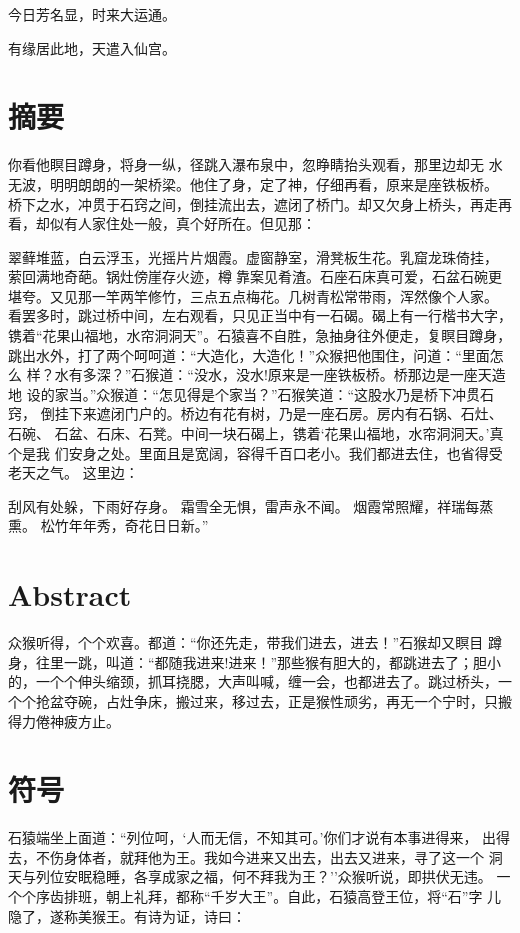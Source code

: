 \documentclass[]{style/zjuthesis}
\begin{document}
今日芳名显，时来大运通。

有缘居此地，天遣入仙宫。

\chapter{摘要}

你看他瞑目蹲身，将身一纵，径跳入瀑布泉中，忽睁睛抬头观看，那里边却无
水无波，明明朗朗的一架桥梁。他住了身，定了神，仔细再看，原来是座铁板桥。
桥下之水，冲贯于石窍之间，倒挂流出去，遮闭了桥门。却又欠身上桥头，再走再
看，却似有人家住处一般，真个好所在。但见那：

翠藓堆蓝，白云浮玉，光摇片片烟霞。虚窗静室，滑凳板生花。乳窟龙珠倚挂，
萦回满地奇葩。锅灶傍崖存火迹，樽靠案见肴渣。石座石床真可爱，石盆石碗更
堪夸。又见那一竿两竿修竹，三点五点梅花。几树青松常带雨，浑然像个人家。
看罢多时，跳过桥中间，左右观看，只见正当中有一石碣。碣上有一行楷书大字，
镌着``花果山福地，水帘洞洞天''。石猿喜不自胜，急抽身往外便走，复瞑目蹲身，
跳出水外，打了两个呵呵道：``大造化，大造化！''众猴把他围住，问道：``里面怎么
样？水有多深？''石猴道：``没水，没水!原来是一座铁板桥。桥那边是一座天造地
设的家当。''众猴道：``怎见得是个家当？''石猴笑道：``这股水乃是桥下冲贯石窍，
倒挂下来遮闭门户的。桥边有花有树，乃是一座石房。房内有石锅、石灶、石碗、
石盆、石床、石凳。中间一块石碣上，镌着`花果山福地，水帘洞洞天。'真个是我
们安身之处。里面且是宽阔，容得千百口老小。我们都进去住，也省得受老天之气。
这里边：

刮风有处躲，下雨好存身。 霜雪全无惧，雷声永不闻。
烟霞常照耀，祥瑞每蒸熏。 松竹年年秀，奇花日日新。''

\chapter{Abstract}\label{abstract}

众猴听得，个个欢喜。都道：``你还先走，带我们进去，进去！''石猴却又瞑目
蹲身，往里一跳，叫道：``都随我进来!进来！''那些猴有胆大的，都跳进去了；胆小
的，一个个伸头缩颈，抓耳挠腮，大声叫喊，缠一会，也都进去了。跳过桥头，一
个个抢盆夺碗，占灶争床，搬过来，移过去，正是猴性顽劣，再无一个宁时，只搬
得力倦神疲方止。 \ZJUListofFigures

\ZJUListofTables

\chapter{符号}

石猿端坐上面道：``列位呵，`人而无信，不知其可。'你们才说有本事进得来，
出得去，不伤身体者，就拜他为王。我如今进来又出去，出去又进来，寻了这一个
洞天与列位安眠稳睡，各享成家之福，何不拜我为王？''众猴听说，即拱伏无违。
一个个序齿排班，朝上礼拜，都称``千岁大王''。自此，石猿高登王位，将``石''字
儿隐了，遂称美猴王。有诗为证，诗曰：
\end{document}
